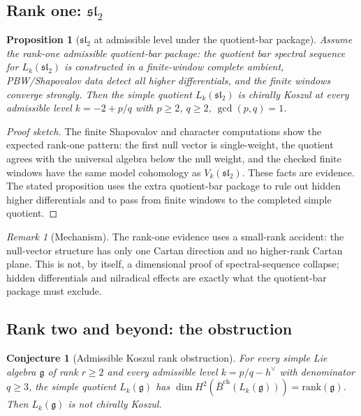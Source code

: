 \documentclass[11pt,reqno]{amsart}
\newtheorem{proposition}[theorem]{Proposition}
\newtheorem{conjecture}[theorem]{Conjecture}
\theoremstyle{definition}
\theoremstyle{remark}
\newtheorem{remark}[theorem]{Remark}
\newcommand{\barBch}{\bar{B}^{\mathrm{ch}}}
\newcommand{\fg}{\mathfrak{g}}
\numberwithin{equation}{section}
\begin{document}
\subsection{Rank one: $\mathfrak{sl}_2$}

\begin{proposition}[$\mathfrak{sl}_2$ at admissible level under the
quotient-bar package]
\label{prop:kfc-sl2-admissible}
Assume the rank-one admissible quotient-bar package: the quotient bar
spectral sequence for $L_k(\mathfrak{sl}_2)$ is constructed in a
finite-window complete ambient, PBW/Shapovalov data detect all higher
differentials, and the finite windows converge strongly. Then the
simple quotient $L_k(\mathfrak{sl}_2)$ is chirally Koszul at every
admissible level $k = -2 + p/q$ with $p \geq 2$, $q \geq 2$,
$\gcd(p,q) = 1$.
\end{proposition}

\begin{proof}[Proof sketch]
The finite Shapovalov and character computations show the expected
rank-one pattern: the first null vector is single-weight, the quotient
agrees with the universal algebra below the null weight, and the
checked finite windows have the same model cohomology as
$V_k(\mathfrak{sl}_2)$. These facts are evidence. The stated
proposition uses the extra quotient-bar package to rule out hidden
higher differentials and to pass from finite windows to the completed
simple quotient.
\end{proof}

\begin{remark}[Mechanism]
\label{rem:kfc-sl2-mechanism}
The rank-one evidence uses a small-rank accident: the null-vector
structure has only one Cartan direction and no higher-rank Cartan
plane. This is not, by itself, a dimensional proof of spectral-sequence
collapse; hidden differentials and nilradical effects are exactly what
the quotient-bar package must exclude.
\end{remark}

\subsection{Rank two and beyond: the obstruction}

\begin{conjecture}[Admissible Koszul rank obstruction]
\label{conj:kfc-admissible-rank}
For every simple Lie algebra $\fg$ of rank $r \geq 2$ and every
admissible level $k = p/q - h^\vee$ with denominator $q \geq 3$,
the simple quotient $L_k(\fg)$ has
$\dim H^2(\barBch(L_k(\fg))) = \mathrm{rank}(\fg)$.
Then $L_k(\fg)$ is not chirally Koszul.
\end{conjecture}
\end{document}

